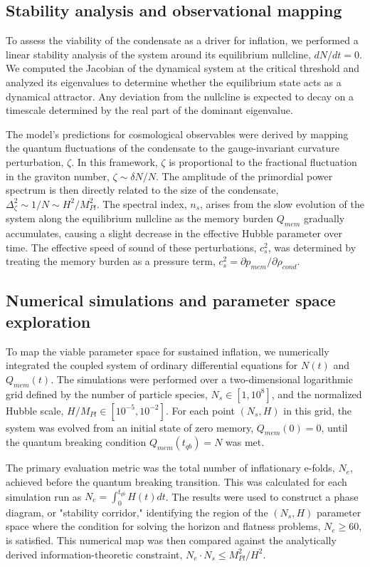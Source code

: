 \documentclass[]{article}
\begin{document}
\subsection{Stability analysis and observational mapping}
To assess the viability of the condensate as a driver for inflation, we performed a linear stability analysis of the system around its equilibrium nullcline, $dN/dt = 0$. We computed the Jacobian of the dynamical system at the critical threshold and analyzed its eigenvalues to determine whether the equilibrium state acts as a dynamical attractor. Any deviation from the nullcline is expected to decay on a timescale determined by the real part of the dominant eigenvalue.

The model's predictions for cosmological observables were derived by mapping the quantum fluctuations of the condensate to the gauge-invariant curvature perturbation, $\zeta$. In this framework, $\zeta$ is proportional to the fractional fluctuation in the graviton number, $\zeta \sim \delta N/N$. The amplitude of the primordial power spectrum is then directly related to the size of the condensate, $\Delta_\zeta^2 \sim 1/N \sim H^2/M_{Pl}^2$. The spectral index, $n_s$, arises from the slow evolution of the system along the equilibrium nullcline as the memory burden $Q_{mem}$ gradually accumulates, causing a slight decrease in the effective Hubble parameter over time. The effective speed of sound of these perturbations, $c_s^2$, was determined by treating the memory burden as a pressure term, $c_s^2 = \partial p_{mem}/\partial \rho_{cond}$.

\subsection{Numerical simulations and parameter space exploration}
To map the viable parameter space for sustained inflation, we numerically integrated the coupled system of ordinary differential equations for $N(t)$ and $Q_{mem}(t)$. The simulations were performed over a two-dimensional logarithmic grid defined by the number of particle species, $N_s \in [1, 10^8]$, and the normalized Hubble scale, $H/M_{Pl} \in [10^{-5}, 10^{-2}]$. For each point $(N_s, H)$ in this grid, the system was evolved from an initial state of zero memory, $Q_{mem}(0) = 0$, until the quantum breaking condition $Q_{mem}(t_{qb}) = N$ was met.

The primary evaluation metric was the total number of inflationary e-folds, $N_e$, achieved before the quantum breaking transition. This was calculated for each simulation run as $N_e = \int_0^{t_{qb}} H(t) dt$. The results were used to construct a phase diagram, or "stability corridor," identifying the region of the $(N_s, H)$ parameter space where the condition for solving the horizon and flatness problems, $N_e \geq 60$, is satisfied. This numerical map was then compared against the analytically derived information-theoretic constraint, $N_e \cdot N_s \leq M_{Pl}^2/H^2$.
\end{document}
